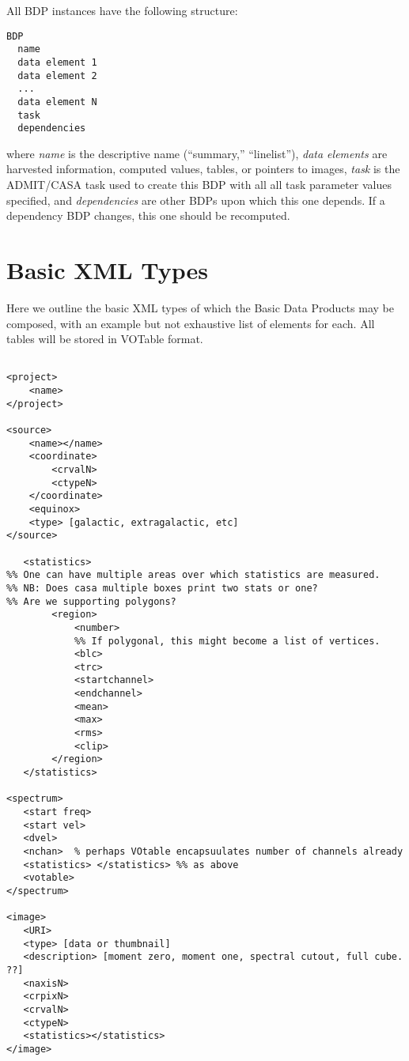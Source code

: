 \documentclass{report}
\begin{document}
\noindent All BDP instances have the following structure:

\begin{verbatim}
BDP
  name 
  data element 1
  data element 2
  ...
  data element N
  task
  dependencies
\end{verbatim}

\noindent where {\it name} is the descriptive name (``summary,''
``linelist''), {\it data elements} are harvested information, computed 
values, tables, or pointers to images, {\it task} is the ADMIT/CASA 
task used to create this BDP with all all task parameter values specified,
and {\it dependencies} are other BDPs upon which this one depends. 
If a dependency BDP changes, this one should be recomputed.


\section{Basic XML Types}

Here we outline the basic XML types of which the Basic Data Products
may be composed, with an example but not exhaustive list of elements for each.
All tables will be stored in VOTable format.
\begin{verbatim}

<project>
    <name>
</project>

<source>
    <name></name>
    <coordinate>
        <crvalN>
        <ctypeN>
    </coordinate>
    <equinox>
    <type> [galactic, extragalactic, etc]
</source>

   <statistics>
%% One can have multiple areas over which statistics are measured.
%% NB: Does casa multiple boxes print two stats or one?
%% Are we supporting polygons?
        <region>
            <number>
            %% If polygonal, this might become a list of vertices.
            <blc>
            <trc>
            <startchannel>
            <endchannel>
            <mean>
            <max>
            <rms>
            <clip>
        </region>
   </statistics>

<spectrum>
   <start freq>
   <start vel>
   <dvel>
   <nchan>  % perhaps VOtable encapsuulates number of channels already
   <statistics> </statistics> %% as above
   <votable>
</spectrum>

<image>
   <URI>
   <type> [data or thumbnail]
   <description> [moment zero, moment one, spectral cutout, full cube. ??] 
   <naxisN>
   <crpixN>
   <crvalN>
   <ctypeN>
   <statistics></statistics>
</image>
\end{verbatim}
\end{document}
